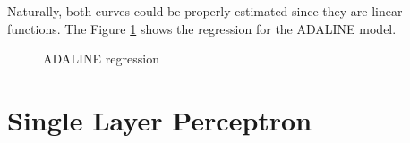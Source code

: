 \documentclass[12pt,a4paper]{article}
\begin{document}
Naturally, both curves could be properly estimated since they are linear functions. The Figure \ref{fig:ADALINE-regression} shows the regression for the ADALINE model.

\begin{figure}[H]
    \centering



\caption{ADALINE regression}
\label{fig:ADALINE-regression}

\end{figure}

\section{Single Layer Perceptron}
\end{document}
